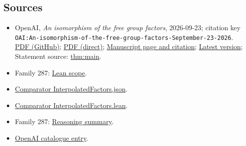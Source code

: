 \documentclass[11pt]{article}
\begin{document}
\subsection{Sources}
\begin{itemize}
\item OpenAI, \emph{An isomorphism of the free group factors}, 2026-09-23; citation key \texttt{OAI:An-isomorphism-of-the-free-group-factors-September-23-2026}. \href{https://github.com/openai/math/blob/adc7f1241b42e322a6451854ab7e4b4c146bf78a/preprints/An-isomorphism-of-the-free-group-factors-September-23-2026/An-isomorphism-of-the-free-group-factors-September-23-2026.pdf}{PDF (GitHub)}; \href{https://github.com/openai/math/raw/adc7f1241b42e322a6451854ab7e4b4c146bf78a/preprints/An-isomorphism-of-the-free-group-factors-September-23-2026/An-isomorphism-of-the-free-group-factors-September-23-2026.pdf}{PDF (direct)}; \href{https://github.com/openai/math/blob/adc7f1241b42e322a6451854ab7e4b4c146bf78a/preprints/An-isomorphism-of-the-free-group-factors-September-23-2026/README.md}{Manuscript page and citation}; \href{https://github.com/openai/math/blob/main/preprints/An-isomorphism-of-the-free-group-factors-September-23-2026/An-isomorphism-of-the-free-group-factors-September-23-2026.pdf}{Latest version}; Statement source: \href{https://github.com/openai/math/blob/adc7f1241b42e322a6451854ab7e4b4c146bf78a/preprints/An-isomorphism-of-the-free-group-factors-September-23-2026/build/main.tex\#L74}{thm:main}.
\item Family 287: \href{https://github.com/openai/math/blob/adc7f1241b42e322a6451854ab7e4b4c146bf78a/lean/docs/287.md}{Lean scope}.
\item \href{https://github.com/openai/math/blob/adc7f1241b42e322a6451854ab7e4b4c146bf78a/lean/ComparatorChallenges/InterpolatedFactors.json}{Comparator InterpolatedFactors.json}.
\item \href{https://github.com/openai/math/blob/adc7f1241b42e322a6451854ab7e4b4c146bf78a/lean/ComparatorChallenges/InterpolatedFactors.lean}{Comparator InterpolatedFactors.lean}.
\item Family 287: \href{https://github.com/openai/math/blob/adc7f1241b42e322a6451854ab7e4b4c146bf78a/reasoning\_traces/free-group-factor-isomorphism.pdf}{Reasoning summary}.
\item \href{https://github.com/openai/math/blob/adc7f1241b42e322a6451854ab7e4b4c146bf78a/CONTENTS.md}{OpenAI catalogue entry}.
\end{itemize}
\end{document}
